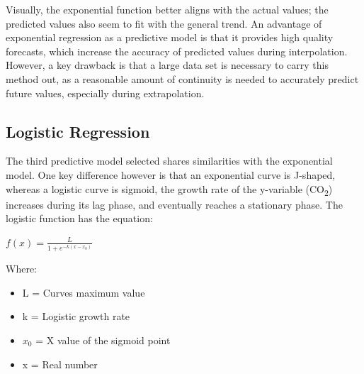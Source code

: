 \documentclass{mcmthesis}
\begin{document}
    \begin{center}
    \end{center}

    Visually, the exponential function better aligns with the actual values; the predicted values also seem to fit with the general trend. An advantage of exponential regression as a predictive model is that it provides high quality forecasts, which increase the accuracy of predicted values during interpolation. However, a key drawback is that a large data set is necessary to carry this method out, as a reasonable amount of continuity is needed to accurately predict future values, especially during extrapolation.


    \subsection{Logistic Regression}
    The third predictive model selected shares similarities with the exponential model. One key difference however is that an exponential curve is J-shaped, whereas a logistic curve is sigmoid, the growth rate of the y-variable (CO\textsubscript{2}) increases during its lag phase, and eventually reaches a stationary phase. The logistic function has the equation:

    ${\displaystyle f(x)={\frac {L}{1+e^{-k(x-x_{0})}}}}$

    Where:
    \begin{itemize}
        \item {L} = Curve\textquotesingle s maximum value
        \item {k} = Logistic growth rate
        \item ${x_0}$ = X value of the sigmoid point
        \item {x} = Real number
    \end{itemize}
\end{document}
